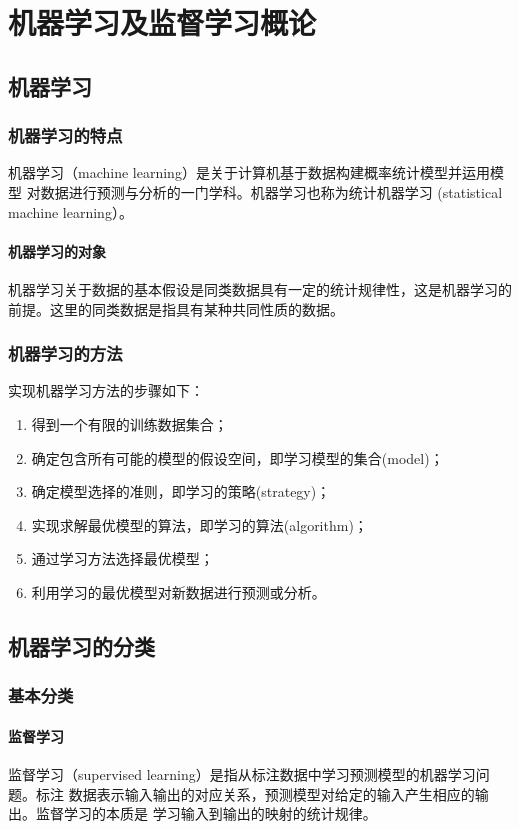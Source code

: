 \chapter{机器学习及监督学习概论\label{Ch01}}
\section{机器学习}
\subsection*{机器学习的特点}
\begin{definition}[机器学习]
    机器学习（machine learning）是关于计算机基于数据构建概率统计模型并运用模型
    对数据进行预测与分析的一门学科。机器学习也称为统计机器学习 (statistical machine
    learning）。
\end{definition}

\subsubsection*{机器学习的对象}
机器学习关于数据的基本假设是同类数据具有一定的统计规律性，这是机器学习的前提。这里的同类数据是指具有某种共同性质的数据。
\subsection*{机器学习的方法}
实现机器学习方法的步骤如下：
\begin{enumerate}
    \item 得到一个有限的训练数据集合；
    \item 确定包含所有可能的模型的假设空间，即学习模型的集合(model)；
    \item 确定模型选择的准则，即学习的策略(strategy)；
    \item 实现求解最优模型的算法，即学习的算法(algorithm)；
    \item 通过学习方法选择最优模型；
    \item 利用学习的最优模型对新数据进行预测或分析。
\end{enumerate}

\section{机器学习的分类}
\subsection{基本分类}
\subsubsection*{监督学习}
\begin{definition}[监督学习]
    监督学习（supervised learning）是指从标注数据中学习预测模型的机器学习问题。标注
    数据表示输入输出的对应关系，预测模型对给定的输入产生相应的输出。监督学习的本质是
    学习输入到输出的映射的统计规律。
\end{definition}

